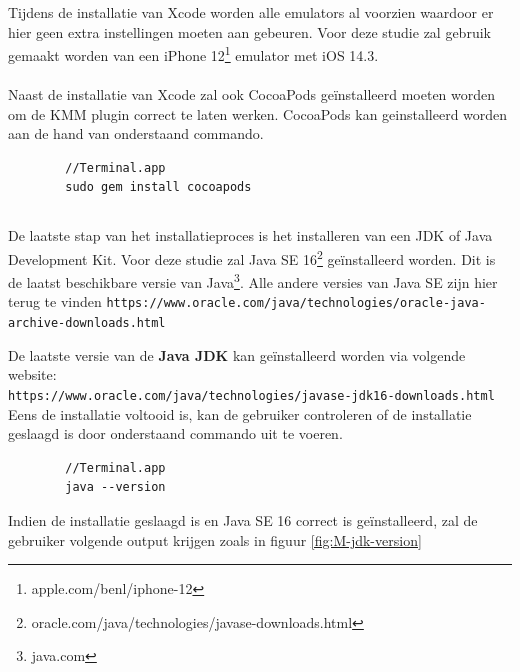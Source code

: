    Tijdens de installatie van Xcode worden alle emulators al voorzien waardoor er hier geen extra instellingen moeten aan gebeuren. Voor deze studie zal gebruik gemaakt worden van een iPhone 12\footnote{apple.com/benl/iphone-12} emulator met iOS 14.3.
    \\ \\
    Naast de installatie van Xcode zal ook CocoaPods geïnstalleerd moeten worden om de KMM plugin correct te laten werken. CocoaPods kan geinstalleerd worden aan de hand van onderstaand commando.
    
    \begin{lstlisting}
        //Terminal.app
        sudo gem install cocoapods
    \end{lstlisting}
    
    \subsection{}
    \label{sec:I-JDK}
    De laatste stap van het installatieproces is het installeren van een JDK of Java Development Kit. Voor deze studie zal Java SE 16\footnote{oracle.com/java/technologies/javase-downloads.html} geïnstalleerd worden. Dit is de laatst beschikbare versie van Java\footnote{java.com}. Alle andere versies van Java SE zijn hier terug te vinden \verb*|https://www.oracle.com/java/technologies/oracle-java-archive-downloads.html|
    
    De laatste versie van de \textbf{Java JDK} kan geïnstalleerd worden via volgende website: \\
    \verb*|https://www.oracle.com/java/technologies/javase-jdk16-downloads.html|
    \\
    
    Eens de installatie voltooid is, kan de gebruiker controleren of de installatie geslaagd is door onderstaand commando uit te voeren.
    \begin{lstlisting}
        //Terminal.app
        java --version
    \end{lstlisting}
    Indien de installatie geslaagd is en Java SE 16 correct is geïnstalleerd, zal de gebruiker volgende output krijgen zoals in figuur \ref{fig:M-jdk-version} 
    
